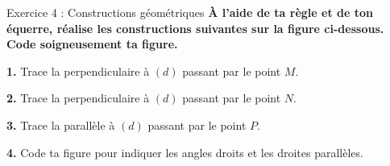 \clearpage

\begin{constructionbox}{ Exercice 4 : Constructions géométriques }
\textbf{À l'aide de ta règle et de ton équerre, réalise les constructions suivantes sur la figure ci-dessous.\\
Code soigneusement ta figure.}

\figureespace{0.5cm}

\begin{center}
\end{center}

\exspace

\textbf{1.} Trace la perpendiculaire à $(d)$ passant par le point $M$. 

\exspace

\textbf{2.} Trace la perpendiculaire à $(d)$ passant par le point $N$. 

\exspace

\textbf{3.} Trace la parallèle à $(d)$ passant par le point $P$. 

\exspace

\textbf{4.} Code ta figure pour indiquer les angles droits et les droites parallèles. 
\end{constructionbox}

